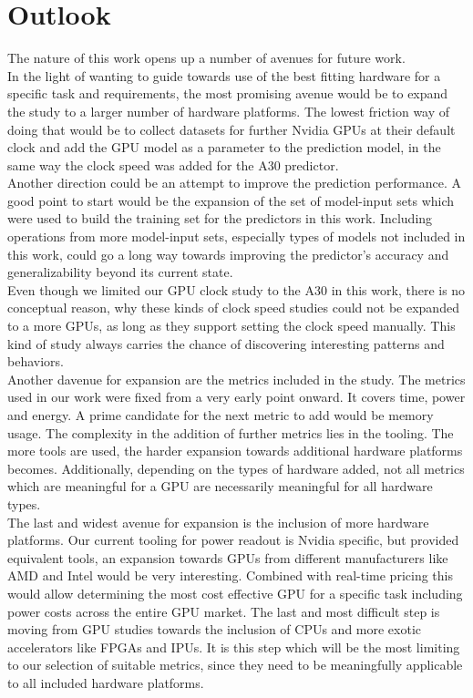 \section{Outlook}
The nature of this work opens up a number of avenues for future work. \\
In the light of wanting to guide towards use of the best fitting hardware for a specific task and requirements, the most promising avenue would be to expand the study to a larger number of hardware platforms. The lowest friction way of doing that would be to collect datasets for further Nvidia GPUs at their default clock and add the GPU model as a parameter to the prediction model, in the same way the clock speed was added for the A30 predictor. \\
Another direction could be an attempt to improve the prediction performance.
A good point to start would be the expansion of the set of model-input sets which were used to build the training set for the predictors in this work. Including operations from more model-input sets, especially types of models not included in this work, could go a long way towards improving the predictor's accuracy and generalizability beyond its current state. \\
Even though we limited our GPU clock study to the A30 in this work, there is no conceptual reason, why these kinds of clock speed studies could not be expanded to a more GPUs, as long as they support setting the clock speed manually. This kind of study always carries the chance of discovering interesting patterns and behaviors.\\
Another davenue for expansion are the metrics included in the study. The metrics used in our work were fixed from a very early point onward. It covers time, power and energy. A prime candidate for the next metric to add would be memory usage. The complexity in the addition of further metrics lies in the tooling. The more tools are used, the harder expansion towards additional hardware platforms becomes. Additionally, depending on the types of hardware added, not all metrics which are meaningful for a GPU are necessarily meaningful for all hardware types. \\
The last and widest avenue for expansion is the inclusion of more hardware platforms. Our current tooling for power readout is Nvidia specific, but provided equivalent tools, an expansion towards GPUs from different manufacturers like AMD and Intel would be very interesting. Combined with real-time pricing this would allow determining the most cost effective GPU for a specific task including power costs across the entire GPU market. The last and most difficult step is moving from GPU studies towards the inclusion of CPUs and more exotic accelerators like FPGAs and IPUs. It is this step which will be the most limiting to our selection of suitable metrics, since they need to be meaningfully applicable to all included hardware platforms. \\
